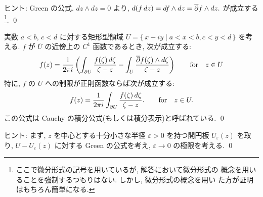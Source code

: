 \documentclass[12pt,twoside]{jarticle}
\begin{document}
\noindent ヒント: Green の公式. $dz\wedge dz = 0$ より, 
\(
  d(f\,dz) = df\wedge dz = {\overline\partial} f \wedge dz.
\) %
が成立する%
\footnote{ここで微分形式の記号を用いているが, 解答において微分形式の
  概念を用いることを強制するつもりはない. しかし, 微分形式の概念を用い
  た方が証明はもちろん簡単になる.}. \qed
%




\begin{question} 
  実数 $a < b$, $c < d$ に対する矩形型領域 %
  $U = \{\, x + iy \mid a<x<b, c<y<d\,\}$ を考える. %
  $f$ が $\overline U$ の近傍上の $C^1$ 函数であるとき, 次が成立する:
  \[
    f(z)
    =
    \frac{1}{2\pi i}
    \left(
      \int_{\partial U} \frac{f(\zeta)\,d\zeta}{\zeta - z}
      -
      \int_U \frac{{\overline\partial} f(\zeta) \wedge d\zeta}{\zeta - z}
    \right)
    \qquad
    \text{for}\quad z\in U
  \]%
  特に, $f$ の $U$ への制限が正則函数ならば次が成立する:
  \[
    f(z)
    =
    \frac{1}{2\pi i}
    \int_{\partial U} \frac{f(\zeta)\,d\zeta}{\zeta - z}.
    \qquad
    \text{for}\quad z\in U.
  \]%
  この公式は Cauchy の積分公式(もしくは積分表示)と呼ばれている. 
  \qed
\end{question}

\noindent ヒント: まず, $z$ を中心とする十分小さな半径 %
$\varepsilon > 0$ を持つ開円板 $U_\varepsilon(z)$ を取り, %
$U - U_\varepsilon(z)$ に対する Green の公式を考え, %
$\varepsilon \to 0$ の極限を考える. \qed



\end{document}
